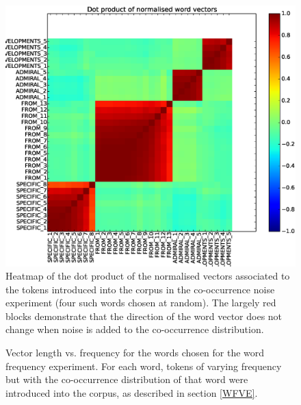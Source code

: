 \documentclass{article} %
\begin{document}
\begin{figure}
\includegraphics[scale=0.5]{word-frequency-experiment-heatmap}
\caption{
Heatmap of the dot product of the normalised vectors associated to the tokens introduced into the corpus in the co-occurrence noise experiment (four such words chosen at random).
The largely red blocks demonstrate that the direction of the word vector does not change when noise is added to the co-occurrence distribution.
}

\label{fig:cooccurrence-noise-heatmap}
\end{figure}
\begin{figure}
\caption{
	Vector length vs. frequency for the words chosen for the word frequency experiment.
	For each word, tokens of varying frequency but with the co-occurrence distribution of that word were introduced into the corpus, as described in section \ref{WFVE}.
}
\label{fig:word-frequency-experiment-graph}
\end{figure}
\end{document}
